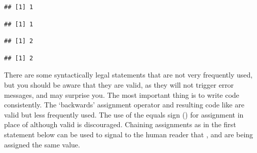 \documentclass[krantz2]{krantz}\usepackage{knitr}%
\begin{document}
\begin{knitrout}\footnotesize
{}\color{fgcolor}\begin{kframe}
\begin{alltt}
\end{alltt}
\begin{verbatim}
## [1] 1
\end{verbatim}
\begin{alltt}
\end{alltt}
\begin{verbatim}
## [1] 1
\end{verbatim}
\begin{alltt}
 \hlopt{+} 
\end{alltt}
\begin{verbatim}
## [1] 2
\end{verbatim}
\begin{alltt}
 \hlopt{+} \hlstd{)}
\end{alltt}
\begin{verbatim}
## [1] 2
\end{verbatim}
\end{kframe}
\end{knitrout}
\begin{playground}
There are some syntactically legal statements that are not very frequently used, but you should be aware that they are valid, as they will not trigger error messages, and may surprise you. The most important thing is to write code consistently. The `backwards' assignment operator \Roperator{->} and resulting code like  are valid but less frequently used. The use of the equals sign (\Roperator{=}) for assignment in place of \Roperator{<-} although valid is discouraged. Chaining assignments as in the first statement below can be used to signal to the human reader that ,  and  are being assigned the same value.

\begin{knitrout}\footnotesize
{}\color{fgcolor}\begin{kframe}
\begin{alltt}
 \hlkwb{<-}  \hlkwb{<-}  \hlkwb{<-} 
 \hlkwb{->} 
 \hlkwb{=} 
\end{alltt}
\end{kframe}
\end{knitrout}

\end{playground}
\end{document}

